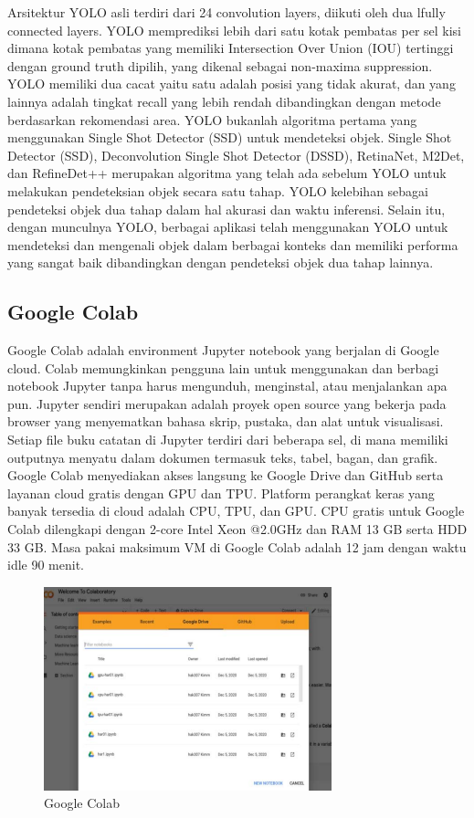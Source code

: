 Arsitektur YOLO asli terdiri dari 24 convolution layers, diikuti oleh dua lfully connected layers. YOLO memprediksi lebih dari satu kotak pembatas per sel kisi dimana kotak pembatas yang memiliki Intersection Over Union (IOU) tertinggi dengan ground truth dipilih, yang dikenal sebagai non-maxima suppression. YOLO memiliki dua cacat yaitu satu adalah posisi yang tidak akurat, dan yang lainnya adalah tingkat recall yang lebih rendah dibandingkan dengan metode berdasarkan rekomendasi area\parencite{Jiang2022}. YOLO bukanlah algoritma pertama yang menggunakan Single Shot Detector (SSD) untuk mendeteksi objek. Single Shot Detector (SSD), Deconvolution Single Shot Detector (DSSD), RetinaNet, M2Det, dan RefineDet++ merupakan algoritma yang telah ada sebelum YOLO untuk melakukan pendeteksian objek secara satu tahap. YOLO kelebihan sebagai pendeteksi objek dua tahap dalam hal akurasi dan waktu inferensi. Selain itu, dengan munculnya YOLO, berbagai aplikasi telah menggunakan YOLO untuk mendeteksi dan mengenali objek dalam berbagai konteks dan memiliki performa yang sangat baik dibandingkan dengan pendeteksi objek dua tahap lainnya\parencite{Diwan2022}.

\subsection{Google Colab}
Google Colab adalah environment Jupyter notebook yang berjalan di Google cloud. Colab memungkinkan pengguna lain untuk menggunakan dan berbagi notebook Jupyter tanpa harus mengunduh, menginstal, atau menjalankan apa pun. Jupyter sendiri merupakan adalah proyek open source yang bekerja pada browser yang menyematkan bahasa skrip, pustaka, dan alat untuk visualisasi. Setiap file buku catatan di Jupyter terdiri dari beberapa sel, di mana memiliki outputnya menyatu dalam dokumen termasuk teks, tabel, bagan, dan grafik. Google Colab menyediakan akses langsung ke Google Drive dan GitHub serta layanan cloud gratis dengan GPU dan TPU. Platform perangkat keras yang banyak tersedia di cloud adalah CPU, TPU, dan GPU. CPU gratis untuk Google Colab dilengkapi dengan 2-core Intel Xeon @2.0GHz dan RAM 13 GB serta HDD 33 GB. Masa pakai maksimum VM di Google Colab adalah 12 jam dengan waktu idle 90 menit\parencite{Kimn2021}.

\begin{figure} [H] \centering
  \includegraphics[scale=1]{gambar/bab2/colab.png}
  \caption{Google Colab \parencite{Kimn2021}}
  \label{fig:colab}
\end{figure}

